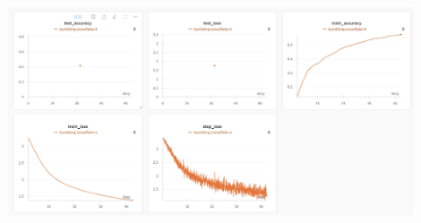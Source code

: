 \documentclass[11pt, oneside]{article}   	%
\begin{document}
\begin{center}
    \includegraphics[width=0.9\textwidth]{p2p2_pic/vqa-clip-result.png}
\end{center}
\end{document}
